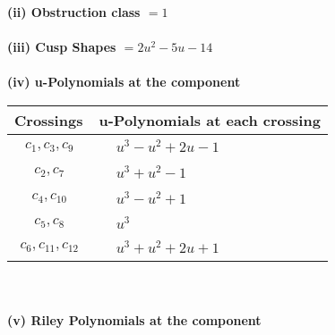 \documentclass[1p]{elsarticle_modified}
\theoremstyle{definition}
\begin{document}
\flushleft \textbf{(ii) Obstruction class $= 1$}\\~\\
\flushleft \textbf{(iii) Cusp Shapes $= 2 u^2-5 u-14$}\\~\\
\newpage\renewcommand{\arraystretch}{1}
\flushleft \textbf{(iv) u-Polynomials at the component}\newline \\
\begin{tabular}{m{50pt}|m{274pt}}
Crossings & \hspace{64pt}u-Polynomials at each crossing \\
\hline $$\begin{aligned}c_{1},c_{3},c_{9}\end{aligned}$$&$\begin{aligned}
&u^3- u^2+2 u-1
\end{aligned}$\\
\hline $$\begin{aligned}c_{2},c_{7}\end{aligned}$$&$\begin{aligned}
&u^3+u^2-1
\end{aligned}$\\
\hline $$\begin{aligned}c_{4},c_{10}\end{aligned}$$&$\begin{aligned}
&u^3- u^2+1
\end{aligned}$\\
\hline $$\begin{aligned}c_{5},c_{8}\end{aligned}$$&$\begin{aligned}
&u^3
\end{aligned}$\\
\hline $$\begin{aligned}c_{6},c_{11},c_{12}\end{aligned}$$&$\begin{aligned}
&u^3+u^2+2 u+1
\end{aligned}$\\
\hline
\end{tabular}\\~\\
\newpage\renewcommand{\arraystretch}{1}
\flushleft \textbf{(v) Riley Polynomials at the component}\newline \\
\end{document}
